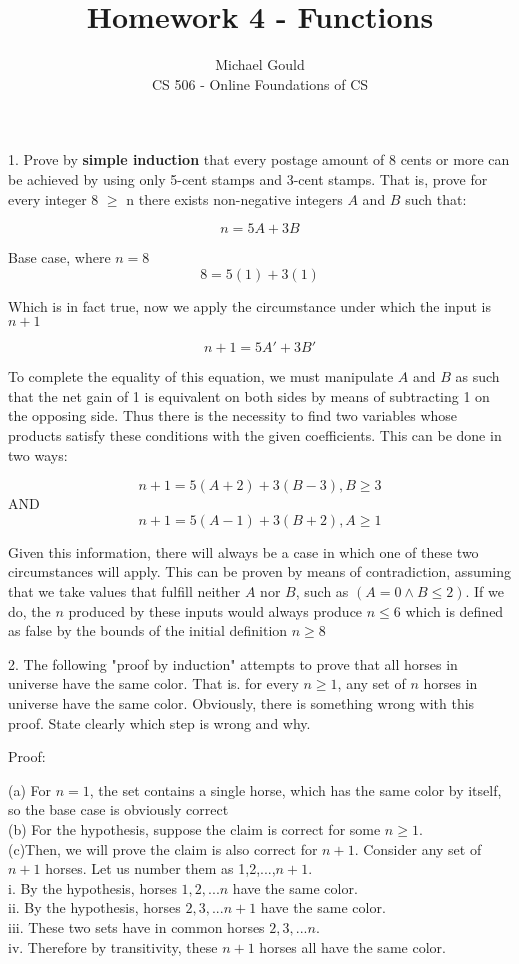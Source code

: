 \documentclass[10pt]{article}
\begin{document}
\title{Homework 4 - Functions}
\author{Michael Gould\\ 
CS 506 - Online Foundations of CS}

\maketitle

1. Prove by \textbf{simple induction} that every postage amount of 8 cents or more can be achieved by using only 5-cent stamps and 3-cent stamps.  That is, prove for every integer 8 $\geq$ n there exists non-negative integers $A$ and $B$ such that:

$$n = 5A + 3B$$

Base case, where $n = 8$
$$8 = 5(1) + 3(1)$$

Which is in fact true, now we apply the circumstance under which the input is $n + 1$

$$n+1 = 5A' + 3B'$$

To complete the equality of this equation, we must manipulate $A$ and $B$ as such that the net gain of 1 is equivalent on both sides by means of subtracting 1 on the opposing side. Thus there is the necessity to find two variables whose products satisfy these conditions with the given coefficients.  This can be done in two ways:

$$n+1 = 5(A+2) + 3(B-3), B \geq 3$$
AND
$$n+1 = 5(A-1) + 3(B+2), A \geq 1$$

Given this information, there will always be a case in which one of these two circumstances will apply.  This can be proven by means of contradiction, assuming that we take values that fulfill neither $A$ nor $B$, such as $(A = 0 \wedge B \leq 2)$.  If we do, the $n$ produced by these inputs would always produce $n \leq 6$ which is defined as false by the bounds of the initial definition $n \geq 8$


2. The following "proof by induction" attempts to prove that all horses in universe have the same color.  That is. for every $n \geq 1$, any set of $n$ horses in universe have the same color.  Obviously, there is something wrong with this proof.  State clearly which step is wrong and why.

Proof:

(a) For $n = 1$, the set contains a single horse, which has the same color by itself, so the base case is obviously correct\\
(b) For the hypothesis, suppose the claim is correct for some $n \geq 1$.\\
(c)Then, we will prove the claim is also correct for $n + 1$.  Consider any set of $n + 1$ horses.  Let us number them as 1,2,...,$n+1$.\\
i. By the hypothesis, horses ${1,2,...n}$ have the same color.\\
ii. By the hypothesis, horses ${2,3,...n+1}$ have the same color.\\
iii. These two sets have in common horses ${2,3,...n}$.\\
iv. Therefore by transitivity, these $n + 1$ horses all have the same color.\\
\end{document}
